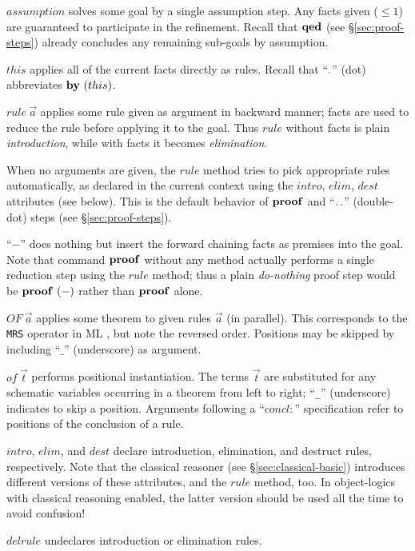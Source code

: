\begin{descr}
\item [$assumption$] solves some goal by a single assumption step.  Any facts
  given (${} \le 1$) are guaranteed to participate in the refinement.  Recall
  that ${\mathord{\mathbf{qed}}}$ (see \S\ref{sec:proof-steps}) already concludes any
  remaining sub-goals by assumption.
\item [$this$] applies all of the current facts directly as rules.  Recall
  that ``${\mathord{\mathbf{.}}}$'' (dot) abbreviates $\BY{this}$.
\item [$rule~\vec a$] applies some rule given as argument in backward manner;
  facts are used to reduce the rule before applying it to the goal.  Thus
  $rule$ without facts is plain \emph{introduction}, while with facts it
  becomes \emph{elimination}.
  
  When no arguments are given, the $rule$ method tries to pick appropriate
  rules automatically, as declared in the current context using the $intro$,
  $elim$, $dest$ attributes (see below).  This is the default behavior of
  ${\mathord{\mathbf{proof}}}$ and ``${\mathord{\mathbf{.\,.}}}$'' (double-dot) steps (see
  \S\ref{sec:proof-steps}).
\item [``$-$''] does nothing but insert the forward chaining facts as premises
  into the goal.  Note that command ${\mathord{\mathbf{proof}}}$ without any method actually
  performs a single reduction step using the $rule$ method; thus a plain
  \emph{do-nothing} proof step would be $\PROOF{-}$ rather than ${\mathord{\mathbf{proof}}}$
  alone.
\item [$OF~\vec a$] applies some theorem to given rules $\vec a$ (in
  parallel).  This corresponds to the \texttt{MRS} operator in ML
  \cite[\S5]{isabelle-ref}, but note the reversed order.  Positions may be
  skipped by including ``$\_$'' (underscore) as argument.
\item [$of~\vec t$] performs positional instantiation.  The terms $\vec t$ are
  substituted for any schematic variables occurring in a theorem from left to
  right; ``\texttt{_}'' (underscore) indicates to skip a position.  Arguments
  following a ``$concl\colon$'' specification refer to positions of the
  conclusion of a rule.
\item [$intro$, $elim$, and $dest$] declare introduction, elimination, and
  destruct rules, respectively.  Note that the classical reasoner (see
  \S\ref{sec:classical-basic}) introduces different versions of these
  attributes, and the $rule$ method, too.  In object-logics with classical
  reasoning enabled, the latter version should be used all the time to avoid
  confusion!
\item [$delrule$] undeclares introduction or elimination rules.
\end{descr}


